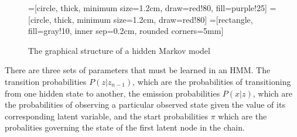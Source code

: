 \documentclass[11pt,letterpaper]{article}
\begin{document}
\begin{figure}[htbp]
\centering
{}=[circle, thick, minimum size=1.2cm, draw=red!80, fill=purple!25]
=[circle, thick, minimum size=1.2cm, draw=red!80]
=[rectangle,
                                                fill=gray!10,
                                                inner sep=0.2cm,
                                                rounded corners=5mm]

\caption{The graphical structure of a hidden Markov model}
\end{figure}

There are three sets of parameters that must be learned in an HMM\@. The transition probabilities
$P(z | z_{n-1})$, which are the probabilities of transitioning from one hidden state to another,
the emission probabilities $P(x | z)$, which are the probabilities of observing a particular observed state
given the value of its corresponding latent variable, and the start probabilities $\pi$ which are the probalities
governing the state of the first latent node in the chain.
\end{document}
